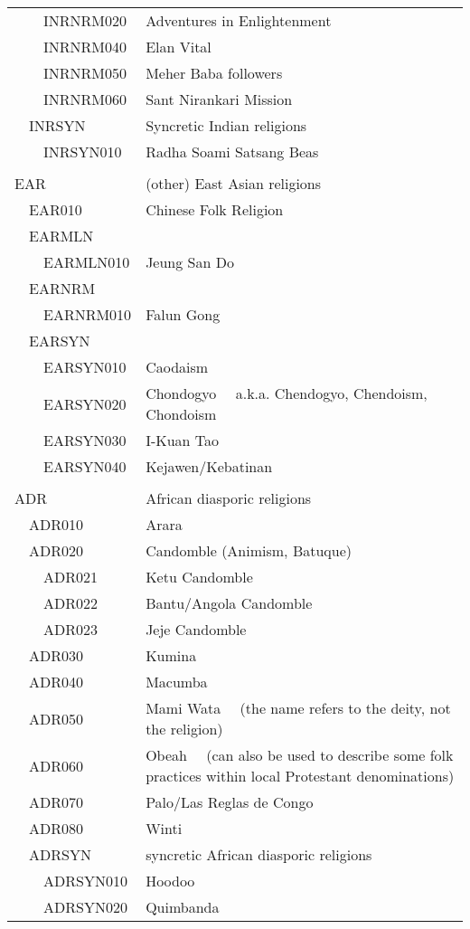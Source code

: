 \documentclass[12pt]{article}
\begin{document}
\begin{tiny}
\begin{center}
\begin{longtable}{|l|l|}
~~~~INRNRM020 & Adventures in Enlightenment \\
~~~~INRNRM040 & Elan Vital \\
~~~~INRNRM050 & Meher Baba followers \\
~~~~INRNRM060 & Sant Nirankari Mission \\
~~INRSYN & Syncretic Indian religions \\
~~~~INRSYN010 & Radha Soami Satsang Beas \\
 \\
{\normalsize EAR } & {\normalsize (other) East Asian religions } \\
~~EAR010 & Chinese Folk Religion \\
~~EARMLN \\
~~~~EARMLN010 & Jeung San Do \\
~~EARNRM \\
~~~~EARNRM010 & Falun Gong \\
~~EARSYN \\
~~~~EARSYN010 & Caodaism \\
~~~~EARSYN020 & Chondogyo	~~a.k.a. Chendogyo, Chendoism, Chondoism \\
~~~~EARSYN030 & I-Kuan Tao \\
~~~~EARSYN040 & Kejawen/Kebatinan \\
 \\
{\normalsize ADR } & {\normalsize African diasporic religions } \\
~~ADR010 & Arara \\
~~ADR020 & Candomble (Animism, Batuque) \\
~~~~ADR021 & Ketu Candomble \\
~~~~ADR022 & Bantu/Angola Candomble \\
~~~~ADR023 & Jeje Candomble \\
~~ADR030 & Kumina \\
~~ADR040 & Macumba \\
~~ADR050 & Mami Wata	~~(the name refers to the deity, not the religion) \\
~~ADR060 & Obeah	~~(can also be used to describe some folk practices within local Protestant denominations) \\
~~ADR070 & Palo/Las Reglas de Congo \\
~~ADR080 & Winti \\
~~ADRSYN & syncretic African diasporic religions \\
~~~~ADRSYN010 & Hoodoo \\
~~~~ADRSYN020 & Quimbanda \\

\end{longtable}
\end{center}
\end{tiny}
\end{document}
